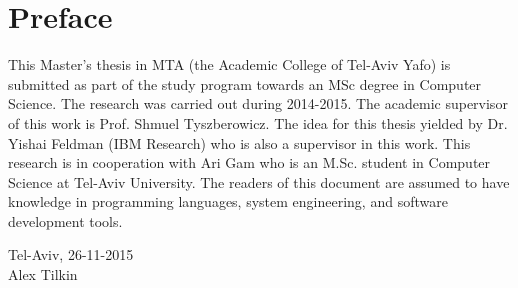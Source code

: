 \section*{Preface}
This Master's thesis in MTA (the Academic College of Tel-Aviv Yafo) is submitted as part of the study program towards an MSc degree in Computer Science. The research was carried out during 2014-2015. The academic supervisor of this work is Prof. Shmuel Tyszberowicz. The idea for this thesis yielded by Dr. Yishai Feldman (IBM Research) who is also a supervisor in this work. This research is in cooperation with Ari Gam who is an M.Sc. student in Computer Science at Tel-Aviv University. The readers of this document are assumed to have knowledge in programming languages, system engineering, and software development tools.\\[2cm]

\begin{center}
Tel-Aviv, 26-11-2015\\[1pc]
Alex Tilkin
\end{center}